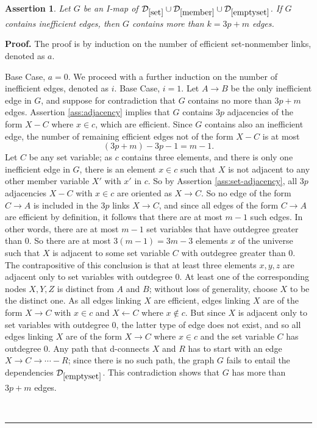 \documentclass{elsarticle}%
\newtheorem{assertion}[theorem]{Assertion}
\renewenvironment{proof}[1][Proof]{\noindent\textbf{#1.} }{\ \rule{0.5em}{0.5em}}
\newcommand{\A}{A}
\newcommand{\B}{B}
\newcommand{\R}{R}
\newcommand{\X}{X}
\newcommand{\Y}{Y}
\newcommand{\Z}{Z}
\newcommand{\C}{C}
\newcommand{\G}{G}
\newcommand{\D}{\mathcal{D}}
\renewcommand{\c}{c}
\newcommand{\x}{x}
\begin{document}
 \begin{assertion} \label{ass:lower-bound}
Let $\G$ be an I-map of $\D_{\ref{set}}\cup \D_{\ref{member}}\cup
\D_{\ref{emptyset}}$. If $\G$ contains inefficient edges, then $\G$ contains more than $k = 3p+m$ edges. 
\end{assertion}

\begin{proof}
The proof is by induction on the number of efficient set-nonmember links, denoted as $a$.

Base Case, $a = 0$. We proceed with a further induction on  the number of inefficient edges, denoted as $i$.
Base Case, $i = 1$. 
Let $\A \rightarrow \B$ be the only inefficient edge in $\G$, and suppose for contradiction that $\G$ contains no more than $3p + m$ edges. Assertion \ref{ass:adjacency}  implies that $\G$ contains $3p$ adjacencies of the form $\X - \C$ where $\x \in \c$, which are efficient. Since $\G$ contains also an inefficient edge, the number of remaining efficient edges not of the form $\X - \C$ is at most $$(3p + m) - 3p -1 = m-1.$$
Let $\C$ be any set variable; as $\c$ contains three elements, and there is only one inefficient edge in $\G$, there is an element $\x \in \c$ such that $\X$ is not adjacent to any other member variable $\X'$ with $\x'$ in $\c$. So by Assertion \ref{ass:set-adjacency}, all $3p$ adjacencies $\X - \C$ with $\x \in \c$ are oriented as $\X \rightarrow \C$. So no edge of the form $\C \rightarrow \A$ is included in the $3p$ links $\X \rightarrow \C$, and since all edges of the form $\C \rightarrow \A$ are efficient by definition, it follows that there are at most $m-1$ such edges. In other words, there are at most $m-1$ set variables that have outdegree greater than 0. So there are at most $3(m-1) = 3m-3$ elements $\x$ of the universe such that $\X$ is adjacent to some set variable $\C$ with outdegree greater than 0. The contrapositive of this conclusion is that at least three elements $x,y,z$ are adjacent only to set variables with outdegree 0. At least one of the corresponding nodes $\X,\Y,\Z$ is distinct from $\A$ and $\B$; without loss of generality, choose $\X$ to be the distinct one. As all edges linking $\X$ are efficient, edges linking $\X$ are of the form $\X \rightarrow \C$ with $\x \in \c$ and $\X \leftarrow \C$ where $\x \not\in \c$. But since $\X$ is adjacent only to set variables with outdegree 0, the latter type of edge does not exist, and so all edges linking $\X$ are of the form $\X \rightarrow \C$ where $\x \in \c$ and the set variable $\C$ has outdegree 0. Any path that d-connects $\X$ and $\R$ has to start with an edge $\X \rightarrow \C \rightarrow \cdots - \R$; since there is no such path, the graph $\G$ fails to entail the dependencies $\D_{\ref{emptyset}}$. This contradiction shows that $\G$ has more than $3p+m$ edges.


\end{proof}
\end{document}
